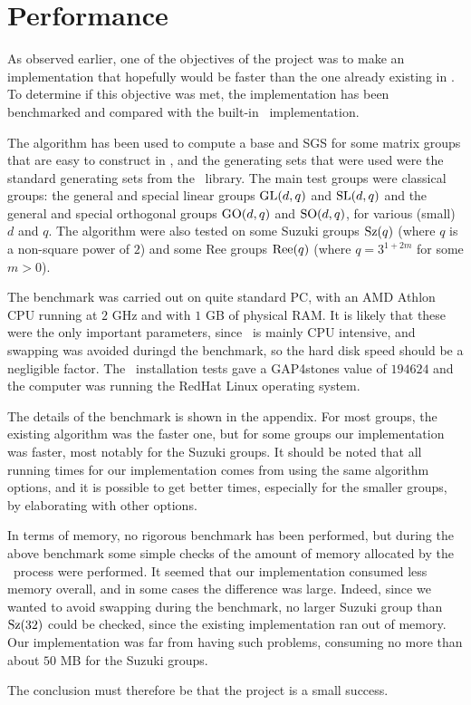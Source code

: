 \chapter{Performance}

As observed earlier, one of the objectives of the project was to make
an implementation that hopefully would be faster than the one already
existing in \GAP. To determine if this objective was met, the
implementation has been benchmarked and compared with the built-in
\GAP~implementation.

The algorithm has been used to compute a base and SGS for some matrix
groups that are easy to construct in \GAP, and the generating sets
that were used were the standard generating sets from the
\GAP~library. The main test groups were classical groups: the general
and special linear groups $\operatorname{GL}(d, q)$ and $\operatorname{SL}(d, q)$ and the general
and special orthogonal groups $\operatorname{GO}(d, q)$ and $\operatorname{SO}(d, q)$, for various
(small) $d$ and $q$. The algorithm were also tested on some Suzuki
groups $\operatorname{Sz}(q)$ (where $q$ is a non-square power of $2$) and some Ree
groups $\operatorname{Ree}(q)$ (where $q = 3^{1 + 2m}$ for some $m > 0$).

The benchmark was carried out on quite standard PC, with an AMD Athlon
CPU running at $2$ GHz and with $1$ GB of physical RAM. It is likely
that these were the only important parameters, since \GAP~is mainly
CPU intensive, and swapping was avoided duringd the benchmark, so the hard disk speed should be a negligible factor. The
\GAP~installation tests gave a GAP4stones value of $194624$ and the computer
was running the RedHat Linux operating system. 

The details of the benchmark is shown in the appendix. For most
groups, the existing algorithm was the faster one, but for some groups
our implementation was faster, most notably for the Suzuki groups. It
should be noted that all running times for our implementation comes
from using the same algorithm options, and it is possible to get
better times, especially for the smaller groups, by elaborating with
other options.

In terms of memory, no rigorous benchmark has been performed, but
during the above benchmark some simple checks of the amount of memory
allocated by the \GAP~process were performed. It seemed that our
implementation consumed less memory overall, and in some cases the
difference was large. Indeed, since we wanted to avoid swapping during
the benchmark, no larger Suzuki group than $\operatorname{Sz}(32)$ could be checked,
since the existing implementation ran out of memory. Our
implementation was far from having such problems, consuming no more
than about $50$ MB for the Suzuki groups.

The conclusion must therefore be that the project is a small success.
